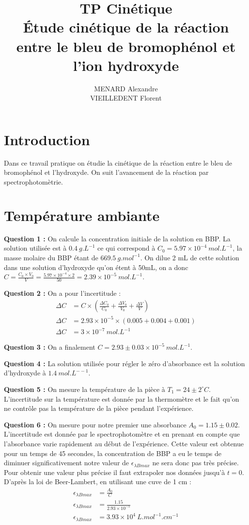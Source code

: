 \documentclass[12pt]{article}
\title{\textbf{TP Cinétique} \\Étude cinétique de la réaction entre le bleu de bromophénol et l'ion hydroxyde}
\author{MENARD Alexandre \\ VIEILLEDENT Florent}
\begin{document}
\maketitle

\section*{Introduction}
Dans ce travail pratique on étudie la cinétique de la réaction entre le bleu de bromophénol et l'hydroxyde.
On suit l'avancement de la réaction par spectrophotomètrie.

\section{Température ambiante}

\textbf{Question 1 :} On calcule la concentration initiale de la solution en BBP. 
La solution utilisée est à $0.4 \ g.L^{-1}$ ce qui correspond à $C_0=5.97\times 10^{-4} \ mol.L^{-1}$, la masse molaire du BBP étant de $669.5 \ g.mol^{-1}$.
On dilue 2 mL de cette solution dans une solution d'hydroxyde qu'on étent à 50mL, on a donc $C=\frac{C_0 \times V_0}{V}=\frac{5.97\times 10^{-4}\times 2}{50}=2.39\times 10^{-5}\ mol.L^{-1}$.

\textbf{Question 2 :} On a pour l'incertitude :
\begin{align*}
    \Delta C &= C \times \left( \frac{\Delta C_0}{C_0} + \frac{\Delta V_0}{V_0} + \frac{\Delta V}{V} \right) \\
    \Delta C &= 2.93\times 10^{-5} \times \left( 0.005 + 0.004 + 0.001 \right) \\
    \Delta C &= 3\times 10^{-7} \ mol.L^{-1}
\end{align*}

\textbf{Question 3 :} On a finalement $C= 2.93 \pm 0.03 \times 10^{-5}\ mol.L^{-1}$.

\textbf{Question 4 :} La solution utilisée pour régler le zéro d'absorbance est la solution d'hydroxyde à $1.4 \ mol.L^{--1}$.

\textbf{Question 5 :} On mesure la température de la pièce à $T_1 = 24 \pm 2 ^\circ C$. 
L'incertitude sur la température est donnée par la thermomètre et le fait qu'on ne contrôle pas la température de la pièce pendant l'expérience.

\textbf{Question 6 :} On mesure pour notre premier une absorbance $A_0=1.15\pm 0.02$. L'incertitude est donnée par le spectrophotomètre et en prenant en compte que l'absorbance varie rapidement au début de l'expérience.
Cette valeur est obtenue pour un temps de 45 secondes, la concentration de BBP a eu le temps de diminuer significativement notre valeur de $\epsilon_{\lambda Bmax}$ ne sera donc pas très précise.
Pour obtenir une valeur plus précise il faut extrapoler nos données jusqu'à $t=0$.
D'après la loi de Beer-Lambert, en utilisant une cuve de 1 cm :
\begin{align*}
    \epsilon_{\lambda Bmax} &= \frac{A_0}{C} \\
    \epsilon_{\lambda Bmax} &= \frac{1.15}{2.93\times 10^{-5}} \\
    \epsilon_{\lambda Bmax} &= 3.93 \times 10^4 \ L.mol^{-1}.cm^{-1}
\end{align*}
\end{document}
